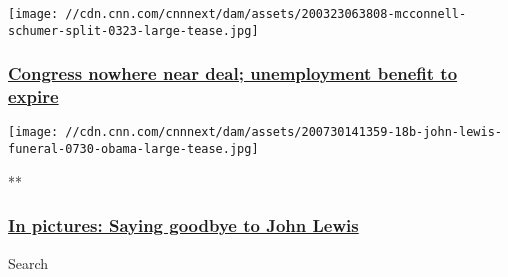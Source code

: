 \href{/2020/07/30/politics/stimulus-latest-negotiations-impasse/index.html}{}

\texttt{[image: //cdn.cnn.com/cnnnext/dam/assets/200323063808-mcconnell-schumer-split-0323-large-tease.jpg]}

\hypertarget{congress-nowhere-near-deal-unemployment-benefit-to-expire-}{%
\subsubsection{\texorpdfstring{\href{/2020/07/30/politics/stimulus-latest-negotiations-impasse/index.html}{Congress
nowhere near deal; unemployment benefit to expire
}}{Congress nowhere near deal; unemployment benefit to expire }}\label{congress-nowhere-near-deal-unemployment-benefit-to-expire-}}

\href{/2020/07/25/politics/gallery/john-lewis-funeral-ceremonies/index.html}{}

\texttt{[image: //cdn.cnn.com/cnnnext/dam/assets/200730141359-18b-john-lewis-funeral-0730-obama-large-tease.jpg]}

**

\hypertarget{in-pictures-saying-goodbye-to-john-lewis}{%
\subsubsection{\texorpdfstring{\href{/2020/07/25/politics/gallery/john-lewis-funeral-ceremonies/index.html}{In
pictures: Saying goodbye to John
Lewis}}{In pictures: Saying goodbye to John Lewis}}\label{in-pictures-saying-goodbye-to-john-lewis}}

Search

